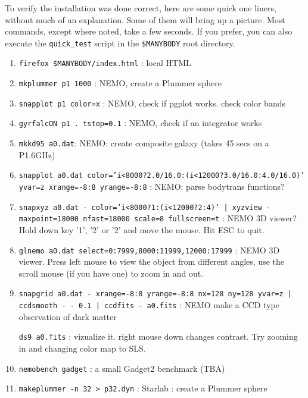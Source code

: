 {To verify the installation was done correct, here are some quick
one liners, without much of an explanation. Some of them will bring up
a picture. Most commands, except where noted, take a few seconds. If
you prefer, you can also execute the {\tt quick\_test} script in
the {\tt \$MANYBODY} root directory.
\begin{enumerate}

\item
{\tt firefox \$MANYBODY/index.html} : local HTML 

\item
{\tt mkplummer p1 1000} : NEMO, create a Plummer sphere

\item
{\tt snapplot p1 color=x} : NEMO, check if pgplot works. check color bands 

\item
{\tt gyrfalcON p1 . tstop=0.1} : NEMO, check if an integrator works

\item
{\tt mkkd95 a0.dat}: NEMO: create composite galaxy (takes 45 secs on a P1.6GHz)

\item
{\tt snapplot a0.dat color='i<8000?2.0/16.0:(i<12000?3.0/16.0:4.0/16.0)' yvar=z xrange=-8:8 yrange=-8:8} :
NEMO: parse bodytrans functions?

\item
{\tt snapxyz a0.dat - color='i<8000?1:(i<12000?2:4)' | xyzview - maxpoint=18000 nfast=18000 scale=8 fullscreen=t} : 
NEMO 3D viewer? Hold down key '1', '2' or '2' and move the mouse. Hit ESC to quit.

\item 
{\tt glnemo a0.dat select=0:7999,8000:11999,12000:17999} : 
NEMO 3D viewer. Press left mouse to view the object from different angles,
use the scroll mouse (if you have one) to zoom in and out.

\item 
{\tt snapgrid a0.dat - xrange=-8:8 yrange=-8:8 nx=128 ny=128 yvar=z | ccdsmooth - - 0.1 | ccdfits - a0.fits} :
NEMO make a CCD type observation of dark matter

{\tt ds9 a0.fits} : vizualize it. right mouse down changes contrast. Try zooming in and changing color map to SLS.

\item
{\tt nemobench gadget} : a small Gadget2 benchmark (TBA)

\item
{\tt makeplummer -n 32 > p32.dyn} : Starlab : create a Plummer sphere



\end{enumerate}}
